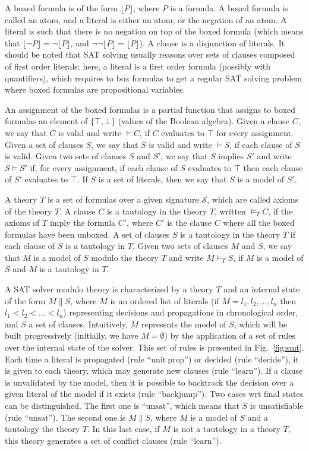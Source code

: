 A boxed formula is of the form $\lfloor{}P\rfloor$, where $P$ is a formula. A
boxed formula is called an atom, and a literal is either an atom, or the negation
of an atom. A literal is such that there is no negation on top of the boxed
formula (which means that $\lfloor\neg{}P\rfloor=\neg\lfloor{}P\rfloor$, and
$\neg\neg\lfloor{}P\rfloor=\lfloor{}P\rfloor$). A clause is a disjunction of
literals. It should be noted that SAT solving usually reasons over sets of
clauses composed of first order literals; here, a literal is a first order
formula (possibly with quantifiers), which requires to box formulas to get a
regular SAT solving problem where boxed formulas are propositional variables.

An assignment of the boxed formulas is a partial function that assigns to boxed
formulas an element of $\{\top,\bot\}$ (values of the Boolean algebra). Given a
clause $C$, we say that $C$ is valid and write $\models{}C$, if $C$ evaluates to
$\top$ for every assignment. Given a set of clauses $S$, we say that $S$ is
valid and write $\models{}S$, if each clause of $S$ is valid. Given two sets of
clauses $S$ and $S'$, we say that $S$ implies $S'$ and write $S\models{}S'$ if,
for every assignment, if each clause of $S$ evaluates to $\top$ then each clause
of $S'$ evaluates to $\top$. If $S$ is a set of literals, then we say that $S$
is a model of $S'$.

A theory $T$ is a set of formulas over a given signature $\mathcal{S}$, which
are called axioms of the theory $T$. A clause $C$ is a tautology in the theory
$T$, written $\models_TC$, if the axioms of $T$ imply the formula $C'$, where
$C'$ is the clause $C$ where all the boxed formulas have been unboxed. A set of
clauses $S$ is a tautology in the theory $T$ if each clause of $S$ is a
tautology in $T$. Given two sets of clauses $M$ and $S$, we say that $M$ is a
model of $S$ modulo the theory $T$ and write $M\models_TS$, if $M$ is a model of
$S$ and $M$ is a tautology in $T$.

A SAT solver modulo theory is characterized by a theory $T$ and an
internal state of the form $M\parallel{}S$, where $M$ is an ordered list of
literals (if $M=l_1,l_2,\ldots,l_n$ then $l_1<l_2<\ldots<l_n$) representing
decisions and propagations in chronological order, and $S$ a set of
clauses. Intuitively, $M$ represents the model of $S$, which will be built
progressively (initially, we have $M=\emptyset$) by the application of a set of
rules over the internal state of the solver. This set of rules is presented in
Fig.~\ref{fig:smt}. Each time a literal is propagated (rule
``$\mathrm{unit~prop}$'') or decided (rule ``$\mathrm{decide}$''), it is given
to each theory, which may generate new clauses (rule ``$\mathrm{learn}$''). If a
clause is unvalidated by the model, then it is possible to backtrack the
decision over a given literal of the model if it exists (rule
``$\mathrm{backjump}$''). Two cases wrt final states can be distinguished.
The first one is ``$\mathrm{unsat}$'', which means that $S$ is
unsatisfiable (rule ``$\mathrm{unsat}$''). The second one is $M\parallel{}S$,
where $M$ is a model of $S$ and a tautology the theory $T$. In this
last case, if $M$ is not a tautology in a theory $T$, this theory generates a
set of conflict clauses (rule ``$\mathrm{learn}$'').

